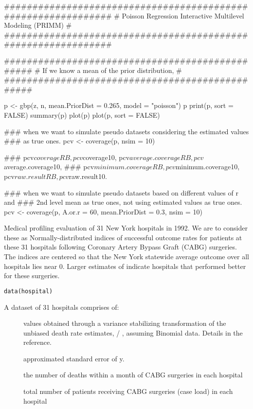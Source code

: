 \documentclass[a4paper]{book}
\begin{document}
\begin{Examples}
\begin{ExampleCode}
  ##############################################################
  # Poisson Regression Interactive Multilevel Modeling (PRIMM) #
  ##############################################################

    ################################################
    # If we know a mean of the prior distribution, #
    ################################################

    p <- gbp(z, n, mean.PriorDist = 0.265, model = "poisson")
    p
    print(p, sort = FALSE)
    summary(p)
    plot(p)
    plot(p, sort = FALSE)

    ### when we want to simulate pseudo datasets considering the estimated values 
    ### as true ones.
    pcv <- coverage(p, nsim = 10)  

    ### pcv$coverageRB, pcv$coverage10, pcv$average.coverageRB, pcv$average.coverage10,
    ### pcv$minimum.coverageRB, pcv$minimum.coverage10, pcv$raw.resultRB, pcv$raw.result10.

    ### when we want to simulate pseudo datasets based on different values of r and
    ### 2nd level mean as true ones, not using estimated values as true ones.
    pcv <- coverage(p, A.or.r = 60, mean.PriorDist = 0.3, nsim = 10)  

\end{ExampleCode}
\end{Examples}
%
\begin{Description}\relax
Medical profiling evaluation of 31 New York hospitals in 1992. We are to consider these as Normally-distributed indices of successful outcome rates for patients at these 31 hospitals following Coronary Artery Bypass Graft (CABG) surgeries. The indices are centered so that the New York statewide average outcome over all hospitals lies near 0. Larger estimates of  indicate hospitals that performed better for these surgeries.
\end{Description}
%
\begin{Usage}
\begin{verbatim}
data(hospital)
\end{verbatim}
\end{Usage}
%
\begin{Format}
A dataset of 31 hospitals comprises of:
\begin{description}

\item[] values obtained through a variance stabilizing transformation of the unbiased death rate estimates,  / , assuming Binomial data. Details in the reference.
\item[] approximated standard error of y.
\item[] the number of deaths within a month of CABG surgeries in each hospital
\item[] total number of patients receiving CABG surgeries (case load) in each hospital

\end{description}

\end{Format}
\end{document}
